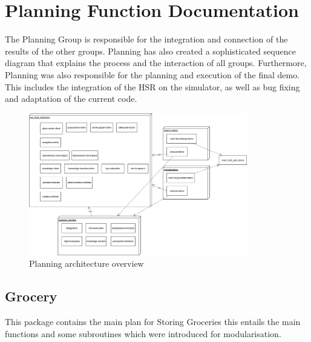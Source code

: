 \documentclass[main.tex]{subfiles}
\begin{document}
	\begingroup

	\renewcommand{\cleardoublepage}{}

	\renewcommand{\clearpage}{}
	
	\newpage

	\chapter{Planning Function Documentation}

		
		The Planning Group is responsible for the integration and connection of the results of the other groups. Planning has also created a sophisticated sequence diagram that explains the process and the interaction of all groups.
	    Furthermore, Planning was also responsible for the planning and execution of the final demo. This includes the integration of the HSR on the simulator, as well as bug fixing and adaptation of the current code.

		\begin{figure}[h]
			\centering
			\includegraphics[width=0.85\textwidth]{pictures/diagramms/planning.png}
			\caption{Planning architecture overview}
			\label{planning-overview}
		\end{figure}
		
		\section{Grocery}
		\label{grocery}
		This package contains the main plan for Storing Groceries this entails the main functions and some subroutines which were introduced for modularisation. 
\end{document}
